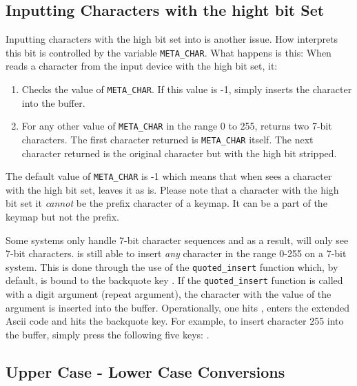 \subsection{Inputting Characters with the hight bit Set}
  Inputting characters with the high bit set into \jed{} is another issue.
  How \jed{} interprets this bit is controlled by the variable
  \verb|META_CHAR|. What happens is this: When \jed{} reads a character from
  the input device with the high bit set, it:
\begin{enumerate}
\item Checks the value of \verb|META_CHAR|.  If this value is -1, \jed{} simply
      inserts the character into the buffer.

\item For any other value of \verb|META_CHAR| in the range 0 to 255, \jed{}
      returns two 7-bit characters.  The first character returned is
      \verb|META_CHAR| itself.  The next character returned is the original
      character but with the high bit stripped.
\end{enumerate}

  The default value of \verb|META_CHAR| is -1 which means that when \jed{} sees
  a character with the high bit set, \jed{} leaves it as is.  Please note that
  a character with the high bit set it {\em cannot} be the prefix character
  of a keymap. It can be a part of the keymap but not the prefix.

  Some systems only handle 7-bit character sequences and as a result, \jed{}
  will only see 7-bit characters.  \jed{} is still able to insert {\em any}
  character in the range 0-255 on a 7-bit system.  This is done through the
  use of the \verb|quoted_insert| function which, by default, is bound to
  the backquote key .  If the \verb|quoted_insert| function is called
  with a digit argument (repeat argument), the character with the value of
  the argument is inserted into the buffer.  Operationally, one hits
  , enters the extended Ascii code and hits the backquote key.  For
  example, to insert character 255 into the buffer, simply press the
  following five keys: .

\subsection{Upper Case - Lower Case Conversions}

